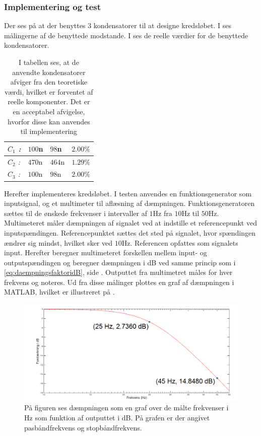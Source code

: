 \subsubsection{Implementering og test} 
Der ses på  at der benyttes 3 kondensatorer til at designe kredsløbet. I  ses målingerne af de benyttede modstande. I  ses de reelle værdier for de benyttede kondensatorer.
\begin{table}[H]
	\centering
	\begin{tabular}{|l|l|l|l|}
		\hline
		\textit{$C_{1}$ :}                            & $100$n             & $98$n              & $2.00\%$           \\ \hline
		\textit{$C_{2}$ :}                            & $470$n             & $464$n             & $1.29\%$           \\ \hline 
		\textit{$C_{3}$ :}                            & $100$n             & $98$n              & $2.00\%$           \\ \hline
	\end{tabular}
	\caption{I tabellen ses, at de anvendte kondensatorer afviger fra den teoretiske værdi, hvilket er forventet af reelle komponenter. Det er en acceptabel afvigelse, hvorfor disse kan anvendes til implementering}
	\label{Tab:Maalingfilter}
\end{table}
\noindent Herefter implementeres kredsløbet. I testen anvendes en funktionsgenerator som inputsignal, og et multimeter til aflæsning af dæmpningen. Funktionsgeneratoren sættes til de ønskede frekvenser i intervaller af $1$Hz fra $10$Hz til $50$Hz. Multimeteret måler dæmpningen af signalet ved at indstille et referencepunkt ved inputspændingen. Referencepunktet sættes det sted på signalet, hvor spændingen ændrer sig mindst, hvilket sker ved $10$Hz. Referencen opfattes som signalets input. Herefter beregner multimeteret forskellen mellem input- og outputspændingen og beregner dæmpningen i dB ved samme princip som i \eqref{eq:daempningsfaktoridB}, side \pageref{eq:daempningsfaktoridB}. Outputtet fra multimetret måles for hver frekvens og noteres. Ud fra disse målinger plottes en graf af dæmpningen i MATLAB, hvilket er illustreret på .  

\begin{figure}[H]
	\centering
	\includegraphics[scale=0.5]{figures/cProblemloesning/Lavpas_Matlab.PNG}
	\caption{På figuren ses dæmpningen som en graf over de målte frekvenser i Hz som funktion af outputtet i dB. På grafen er der angivet pasbåndfrekvens og stopbåndfrekvens.}
	\label{fig:Lavpas_Matlab}
\end{figure}

